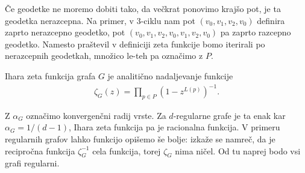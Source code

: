 Če geodetke ne moremo dobiti tako, da večkrat ponovimo krajšo pot, je ta geodetka nerazcepna. Na primer, v 3-ciklu nam pot \((v_0, v_1, v_2, v_0)\) definira zaprto nerazcepno geodetko, pot \((v_0, v_1, v_2, v_0, v_1, v_2, v_0)\) pa zaprto razcepno geodetko. Namesto praštevil v definiciji zeta funkcije bomo iterirali po nerazcepnih geodetkah, množico le-teh pa označimo z \(P\).

\begin{definicija}
    Ihara zeta funkcija grafa \(G\) je analitično nadaljevanje funkcije
    \begin{align*}
        \zeta_G(z) = \prod_{p\in P}\left(1-z^{L(p)}\right)^{-1}.
    \end{align*}
\end{definicija}
 
Z \(\alpha_G\) označimo konvergenčni radij vrste. Za \(d\)-regularne grafe je ta enak kar \(\alpha_G = 1/(d-1)\), Ihara zeta funkcija pa je racionalna funkcija. V primeru regularnih grafov lahko funkcijo opišemo še bolje: izkaže se namreč, da je recipročna funkcija \(\zeta_G^{-1}\) cela funkcija, torej \(\zeta_G\) nima ničel. Od tu naprej bodo vsi grafi regularni.

